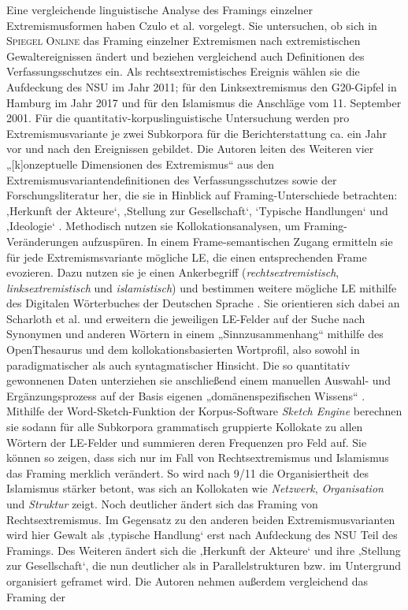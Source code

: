 Eine vergleichende linguistische Analyse des Framings einzelner Extremismusformen haben Czulo et al. \autocite*{czuloEinflussExtremistischerGewaltereignisse2020} vorgelegt. Sie untersuchen, ob sich in \textsc{Spiegel Online} das Framing einzelner Extremismen nach extremistischen Gewaltereignissen ändert und beziehen vergleichend auch Definitionen des Verfassungsschutzes ein. Als rechtsextremistisches Ereignis wählen sie die Aufdeckung des NSU im Jahr 2011; für den Linksextremismus den G20-Gipfel in Hamburg im Jahr 2017 und für den Islamismus die Anschläge vom 11. September 2001. Für die quantitativ-korpuslinguistische Untersuchung werden pro Extremismusvariante je zwei Subkorpora für die Berichterstattung ca. ein Jahr vor und nach den Ereignissen gebildet. Die Autoren leiten des Weiteren vier „{[}k{]}onzeptuelle Dimensionen des Extremismus`` aus den Extremismusvariantendefinitionen des Verfassungsschutzes sowie der Forschungsliteratur her, die sie in Hinblick auf Framing-Unterschiede betrachten: ‚Herkunft der Akteure`, ‚Stellung zur Gesellschaft`, `Typische Handlungen` und ‚Ideologie` \autocite*[20-23]{czuloEinflussExtremistischerGewaltereignisse2020}. Methodisch nutzen sie Kollokationsanalysen, um Framing-Veränderungen aufzuspüren. In einem Frame-semantischen Zugang ermitteln sie für jede Extremismsvariante mögliche LE, die einen entsprechenden Frame evozieren. Dazu nutzen sie je einen Ankerbegriff (\emph{rechtsextremistisch}, \emph{linksextremistisch} und \emph{islamistisch}) und bestimmen weitere mögliche LE mithilfe des Digitalen Wörterbuches der Deutschen Sprache \autocite[DWDS;][]{berlin-brandenburgischeakademiederwissenschaftenDWDSDigitalesWorterbucho.J.}. Sie orientieren sich dabei an Scharloth et al. \autocite*{scharlothWuchernRhizomeLinguistische2013} und erweitern die jeweiligen LE-Felder auf der Suche nach Synonymen und anderen Wörtern in einem „Sinnzusammenhang`` \autocite*[28]{czuloEinflussExtremistischerGewaltereignisse2020} mithilfe des OpenThesaurus und dem kollokationsbasierten Wortprofil, also sowohl in paradigmatischer als auch syntagmatischer Hinsicht. Die so quantitativ gewonnenen Daten unterziehen sie anschließend einem manuellen Auswahl- und Ergänzungsprozess auf der Basis eigenen „domänenspezifischen Wissens`` \autocite[27]{czuloEinflussExtremistischerGewaltereignisse2020}. Mithilfe der Word-Sketch-Funktion der Korpus-Software \emph{Sketch Engine} \autocite{kilgarriffSketchEngineTen2014} berechnen sie sodann für alle Subkorpora grammatisch gruppierte Kollokate zu allen Wörtern der LE-Felder und summieren deren Frequenzen pro Feld auf. Sie können so zeigen, dass sich nur im Fall von Rechtsextremismus und Islamismus das Framing merklich verändert. So wird nach 9/11 die Organisiertheit des Islamismus stärker betont, was sich an Kollokaten wie \emph{Netzwerk}, \emph{Organisation} und \emph{Struktur} zeigt. Noch deutlicher ändert sich das Framing von Rechtsextremismus. Im Gegensatz zu den anderen beiden Extremismusvarianten wird hier Gewalt als ‚typische Handlung` erst nach Aufdeckung des NSU Teil des Framings. Des Weiteren ändert sich die ‚Herkunft der Akteure` und ihre ‚Stellung zur Gesellschaft`, die nun deutlicher als in Parallelstrukturen bzw. im Untergrund organisiert geframet wird. Die Autoren nehmen außerdem vergleichend das Framing der 